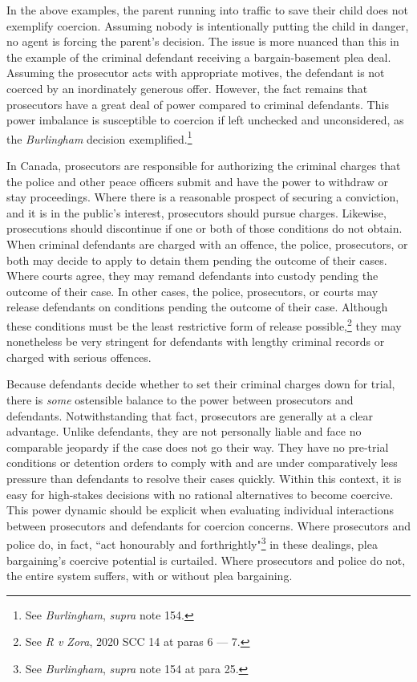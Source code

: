 In the above examples, the parent running into traffic to save their child does not exemplify coercion. Assuming nobody is intentionally putting the child in danger, no agent is forcing the parent's decision. The issue is more nuanced than this in the example of the criminal defendant receiving a bargain-basement plea deal. Assuming the prosecutor acts with appropriate motives, the defendant is not coerced by an inordinately generous offer. However, the fact remains that prosecutors have a great deal of power compared to criminal defendants. This power imbalance is susceptible to coercion if left unchecked and unconsidered, as the \textit{Burlingham} decision exemplified.\footnote{See \textit{Burlingham}, \textit{supra} note 154.}

In Canada, prosecutors are responsible for authorizing the criminal charges that the police and other peace officers submit and have the power to withdraw or stay proceedings. Where there is a reasonable prospect of securing a conviction, and it is in the public's interest, prosecutors should pursue charges. Likewise, prosecutions should discontinue if one or both of those conditions do not obtain. When criminal defendants are charged with an offence, the police, prosecutors, or both may decide to apply to detain them pending the outcome of their cases. Where courts agree, they may remand defendants into custody pending the outcome of their case. In other cases, the police, prosecutors, or courts may release defendants on conditions pending the outcome of their case. Although these conditions must be the least restrictive form of release possible,\footnote{See \textit{R v Zora}, 2020 SCC 14 at paras 6 — 7.} they may nonetheless be very stringent for defendants with lengthy criminal records or charged with serious offences.

Because defendants decide whether to set their criminal charges down for trial, there is \textit{some} ostensible balance to the power between prosecutors and defendants. Notwithstanding that fact, prosecutors are generally at a clear advantage. Unlike defendants, they are not personally liable and face no comparable jeopardy if the case does not go their way. They have no pre-trial conditions or detention orders to comply with and are under comparatively less pressure than defendants to resolve their cases quickly. Within this context, it is easy for high-stakes decisions with no rational alternatives to become coercive. This power dynamic should be explicit when evaluating individual interactions between prosecutors and defendants for coercion concerns. Where prosecutors and police do, in fact, ``act honourably and forthrightly"\footnote{See \textit{Burlingham}, \textit{supra} note 154 at para 25.} in these dealings, plea bargaining's coercive potential is curtailed. Where prosecutors and police do not, the entire system suffers, with or without plea bargaining.

